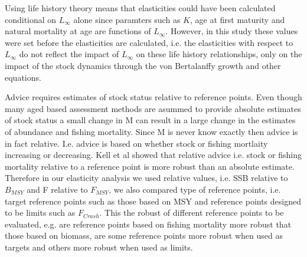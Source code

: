 \documentclass[%
nonumbib,      %
%
]{nrc1}                          %
\begin{document}
Using life history theory means that elasticities could have been calculated conditional on $L_{\infty}$ alone since paramters such as $K$, age at first maturity 
and natural mortality at age are functions of $L_{\infty}$. However, in this study these values were set before the elasticities are calculated, i.e. the elasticities 
with respect to $L_{\infty}$ do not reflect the impact of $L_{\infty}$ on these life history relationships, only on the impact of the stock dynamics 
through the von Bertalanffy growth and other equations.  

Advice requires estimates of stock status relative to reference points. Even though many aged based assessment methods are asummed to provide absolute 
estimates of stock status a small change in M can result in a large change in the estimates of abundance and fishing mortality. Since M is never know 
exactly then advice is in fact relative. I.e. advice is based on whether stock or fishing mortlaity increasing or decreasing. Kell et al showed that relative advice i.e. 
stock or fishing mortality relative to a reference point is more robust than an absolute estimate. Therefore in our elasticity analysis we used relative 
values, i.e. SSB relative to $B_{MSY}$ and F relative to $F_{MSY}$, we also compared type of reference points, i.e. target reference points such as those 
based on MSY and reference points designed to be limits such as $F_{Crash}$. This the robust of different reference points to be evaluated, e.g. are reference points 
based on fishing mortality more robust that those based on biomass, are some reference points more robust when used as targets and others more robust 
when used as limits. 


\newpage\clearpage


%
\end{document}
